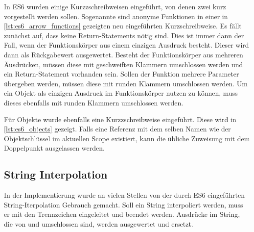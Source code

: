 In ES6 wurden einige Kurzzschreibweisen eingeführt, von denen zwei kurz
vorgestellt werden sollen.  Sogenannte  sind anonyme Funktionen in einer in
\cref{lst:es6_arrow_functions} gezeigten neu eingeführten Kurzschreibweise.  Es
fällt zunächst auf, dass keine Return-Statements nötig sind.  Dies ist immer
dann der Fall, wenn der Funktionskörper aus einem einzigen Ausdruck besteht.
Dieser wird dann als Rückgabewert ausgewertet.  Besteht der Funktionskörper aus
mehreren Äusdrücken, müssen diese mit geschweiften Klammern umschlossen werden
und ein Return-Statement vorhanden sein.  Sollen der Funktion mehrere Parameter
übergeben werden, müssen diese mit runden Klammern umschlossen werden.  Um ein
Objekt als einzigen Ausdruck im Funktionskörper nutzen zu können, muss dieses
ebenfalls mit runden Klammern umschlossen werden.



Für Objekte wurde ebenfalls eine Kurzzschreibweise eingeführt. Diese wird in
\cref{lst:es6_objects} gezeigt.  Falls eine Referenz mit dem selben Namen wie
der Objektschlüssel im aktuellen Scope existiert, kann die übliche Zuweisung mit
dem Doppelpunkt ausgelassen werden.



\subsection{String Interpolation}
\label{sssec:ges_string_interpolation}

In der Implementierung wurde an vielen Stellen von der durch ES6 eingeführten
String-Iterpolation Gebrauch gemacht.  Soll ein String interpoliert werden, muss
er mit den Trennzeichen  eingeleitet und beendet werden.  Ausdrücke im
String, die von \code{\$\{} und \code{\}} umschlossen sind, werden ausgewertet
und ersetzt.
